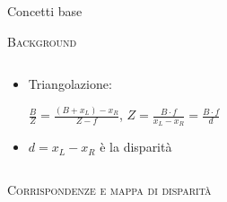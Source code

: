 \documentclass{beamer}
\begin{document}
\begin{section}{Concetti base}
\begin{frame}[t]{\textsc{Background}}
\begin{columns}
\begin{column}{5cm}
\begin{itemize}
\item \small{Triangolazione}:

\begin{center}
 $\frac{B}{Z} = \frac{(B+x_{L}) - x_{R}}{Z-f}$,
$Z = \frac{B \cdot f}{x_{L} - x_{R}} = \frac{B \cdot f}{d}$
\end{center}


\item  $ d = x_{L} - x_{R} $ \`{e} la disparit\`{a} 
\end{itemize}

\end{column}
\end{columns}
\end{frame}


\begin{frame}[t]{\textsc{Corrispondenze e mappa di disparit\`{a}}}



\end{frame}
\end{section}
\end{document}
